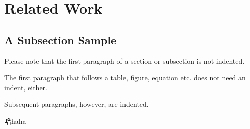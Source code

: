 \section{Related Work}
\subsection{A Subsection Sample}
Please note that the first paragraph of a section or subsection is not indented. 

The first paragraph that follows a table, figure,
equation etc. does not need an indent, either.

Subsequent paragraphs, however, are indented.\cite{luo2020dream}

哈haha